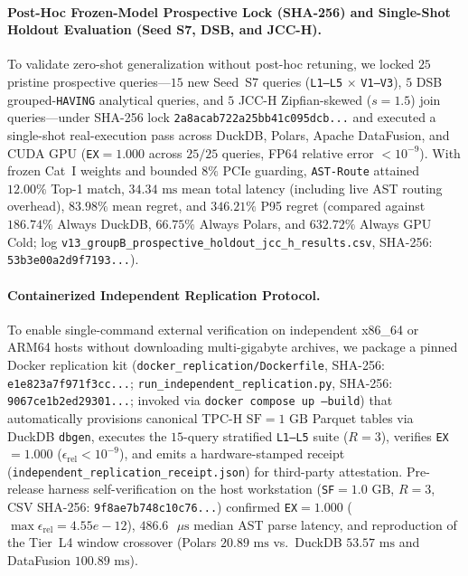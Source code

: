 \documentclass[10pt,a4paper]{article}
\begin{document}
\paragraph{Post-Hoc Frozen-Model Prospective Lock (SHA-256) and Single-Shot Holdout Evaluation (Seed S7, DSB, and JCC-H).}
To validate zero-shot generalization without post-hoc retuning, we locked $25$ pristine prospective queries---$15$ new Seed~S7 queries (\texttt{L1--L5} $\times$ \texttt{V1--V3}), $5$ DSB grouped-\texttt{HAVING} analytical queries, and $5$ JCC-H Zipfian-skewed ($s=1.5$) join queries---under SHA-256 lock \texttt{2a8acab722a25bb41c095dcb...} and executed a single-shot real-execution pass across DuckDB, Polars, Apache DataFusion, and CUDA GPU (\texttt{EX}$=1.000$ across $25/25$ queries, FP64 relative error $<10^{-9}$). With frozen Cat~I weights and bounded $8\%$ PCIe guarding, \texttt{AST-Route} attained $12.00\%$ Top-1 match, $34.34\text{ ms}$ mean total latency (including live AST routing overhead), $83.98\%$ mean regret, and $346.21\%$ P95 regret (compared against $186.74\%$ Always DuckDB, $66.75\%$ Always Polars, and $632.72\%$ Always GPU Cold; log \texttt{v13\_\allowbreak{}groupB\_\allowbreak{}prospective\_\allowbreak{}holdout\_\allowbreak{}jcc\_\allowbreak{}h\_\allowbreak{}results.csv}, SHA-256: \texttt{53b3e00a2d9f7193...}).



\paragraph{Containerized Independent Replication Protocol.}
To enable single-command external verification on independent x86\_64 or ARM64 hosts without downloading multi-gigabyte archives, we package a pinned Docker replication kit (\texttt{docker\_\allowbreak{}replication/\allowbreak{}Dockerfile}, SHA-256: \texttt{e1e823a7f971f3cc...}; \texttt{run\_\allowbreak{}independent\_\allowbreak{}replication.py}, SHA-256: \texttt{9067ce1b2ed29301...}; invoked via \texttt{docker compose up --build}) that automatically provisions canonical TPC-H $\text{SF}=1\text{ GB}$ Parquet tables via DuckDB \texttt{dbgen}, executes the $15$-query stratified \texttt{L1--L5} suite ($R=3$), verifies \texttt{EX}$=1.000$ ($\epsilon_{\text{rel}} < 10^{-9}$), and emits a hardware-stamped receipt (\texttt{independent\_\allowbreak{}replication\_\allowbreak{}receipt.json}) for third-party attestation. Pre-release harness self-verification on the host workstation (\texttt{SF}$=1.0\text{ GB}$, $R=3$, CSV SHA-256: \texttt{9f8ae7b748c10c76...}) confirmed \texttt{EX}$=1.000$ ($\max\epsilon_{\text{rel}}=4.55e-12$), $486.6\text{ }\mu\text{s}$ median AST parse latency, and reproduction of the Tier~L4 window crossover (Polars $20.89\text{ ms}$ vs.\ DuckDB $53.57\text{ ms}$ and DataFusion $100.89\text{ ms}$).
\end{document}

